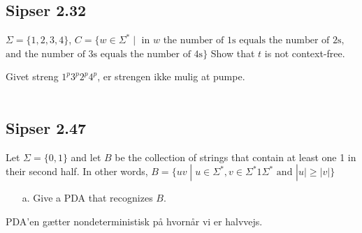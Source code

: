 \subsection*{Sipser 2.32}
\noindent
$\Sigma = \{1,2,3,4\}$, $C = \{w \in \Sigma^{*} \; | \; \text{ in }w \text{ the number of 1s equals the number of 2s,}$\\
\noindent
$\text{and the number of 3s equals the number of 4s}\}$ Show that $t$ is not context-free.

Givet streng $1^{p}3^{p}2^{p}4^{p}$, er strengen ikke mulig at pumpe.\\\\

\noindent
\subsection*{Sipser 2.47}
\noindent

Let $\Sigma = \{0,1\}$ and let $B$ be the collection of strings that contain at least one 1 in their second half. In other words, $B = \{uv \; |\; u \in \Sigma^{*}, v \in \Sigma^{*}1\Sigma^{*} \text{ and } |u| \ge |v|\}$

\begin{enumerate}
  \item[a.] Give a PDA that recognizes $B$.
\end{enumerate}

PDA'en gætter nondeterministisk på hvornår vi er halvvejs.

